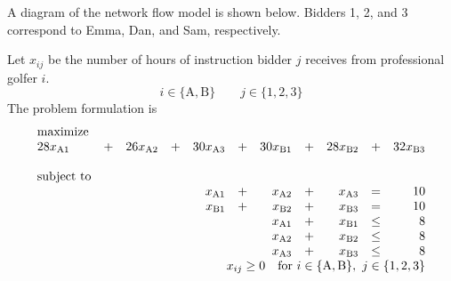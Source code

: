 \begin{enumerate}
\begin{solution}
  \bs A diagram of the network flow model is shown below. Bidders 1, 2,
  and 3 correspond to Emma, Dan, and Sam, respectively.
\vspace{.2in}
\begin{center}
\end{center}

Let $x_{ij}$ be the number of hours of instruction bidder $j$ receives
from professional golfer $i$.
  \[
     i \in \{\text{A},\text{B}\} \qquad j \in \{1,2,3\}
  \]
  The problem formulation is
\[
  \begin{array}{lrrrrrrrrrr}
    \textrm{maximize} &&&&&&&&&&\\   
    28x_{\text{A}1}&+& 26x_{\text{A}2}&+&30x_{\text{A}3}&+&30x_{\text{B}1}&+&28x_{\text{B}2}&+&32x_{\text{B}3} \\ \\
    \textrm{subject to}  &&&&&&&&&&\\
    & & & & x_{\text{A}1}&+ & x_{\text{A}2}&+ &x_{\text{A}3} & = & 10 \\
    & & & & x_{\text{B}1}&+ & x_{\text{B}2}&+ &x_{\text{B}3} & = & 10 \\
    & & & & & &  x_{\text{A}1} & + & x_{\text{B}1} & \leq & 8 \\
    & & & & & &  x_{\text{A}2} & + & x_{\text{B}2} & \leq & 8 \\
    & & & & & &  x_{\text{A}3} & + & x_{\text{B}3} & \leq & 8 \\
    \multicolumn{11}{r}{x_{ij} \geq 0 \quad \text{for}~i \in \{\text{A},\text{B}\},~j \in \{1,2,3\} }
  \end{array}
\]


\end{solution}
\end{enumerate}

